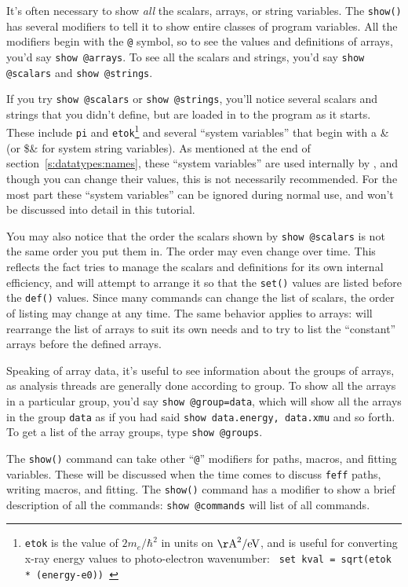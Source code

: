 \documentclass[11pt]{article}
\begin{document}
It's often necessary to show {\emph{all}} the scalars, arrays, or string
variables.  The {\tt{show()}} has several modifiers to tell it to show
entire classes of program variables.  All the modifiers begin with the
{\tt{@}} symbol, so to see the values and definitions of arrays, you'd say
{\tt{show @arrays}}.  To see all the scalars and strings, you'd say
{\tt{show @scalars}} and {\tt{show @strings}}.

If you try {\tt{show @scalars}} or {\tt{show @strings}}, you'll notice
several scalars and strings that you didn't define, but are loaded in to
the program as it starts.  These include {\tt{pi}} and
{\tt{etok}}\footnote{{\tt{etok}} is the value of $2m_e/\hbar^2$ in units on
  $\rm {\AA}^2/eV$, and is useful for converting x-ray energy values to
  photo-electron wavenumber: {\tt{ set kval = sqrt(etok * (energy-e0)) }}}
and several ``system variables'' that begin with a {\&} (or \$\& for system
string variables).  As mentioned at the end of
section~\ref{s:datatypes:names}, these ``system variables'' are used
internally by {\ifeffit}, and though you can change their values, this is
not necessarily recommended.  For the most part these ``system variables''
can be ignored during normal use, and won't be discussed into detail in
this tutorial.

You may also notice that the order the scalars shown by {\tt{show
    @scalars}} is not the same order you put them in.  The order may even
change over time.  This reflects the fact {\ifeffit} tries to manage the
scalars and definitions for its own internal efficiency, and will attempt
to arrange it so that the {\tt{set()}} values are listed before the
{\tt{def()}} values.  Since many commands can change the list of scalars,
the order of listing may change at any time.  The same behavior applies to
arrays: {\ifeffit} will rearrange the list of arrays to suit its own needs
and to try to list the ``constant'' arrays before the defined arrays.

Speaking of array data, it's useful to see information about the groups of
arrays, as analysis threads are generally done according to group. To show
all the arrays in a particular group, you'd say {\tt{show @group=data}},
which will show all the arrays in the group {\tt{data}} as if you had said
{\tt{show data.energy, data.xmu}} and so forth.  To get a list of the array
groups, type {\tt{show @groups}}.

The {\tt{show()}} command can take other ``{\tt{@}}'' modifiers for {\feff}
paths, macros, and fitting variables.  These will be discussed when the
time comes to discuss {\tt{feff}} paths, writing macros, and fitting.  The
{\tt{show()}} command has a modifier to show a brief description of all the
commands: {\tt{show @commands}} will list of all commands.
\end{document}

